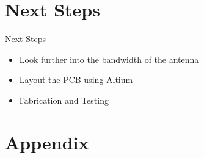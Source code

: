 \documentclass{beamer}
\begin{document}

\section{Next Steps}

\begin{frame}{Next Steps}
\begin{itemize}

  \item <1-> Look further into the bandwidth of the antenna
  \item <2-> Layout the PCB using Altium
  \item <3-> Fabrication and Testing
\end{itemize}
\end{frame}

\section*{Appendix}
\end{document}
